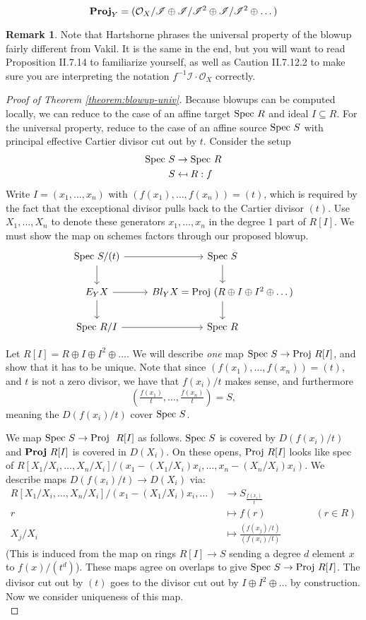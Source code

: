 \documentclass[10pt,reqno]{amsart}
\theoremstyle{definition}
\newtheorem{remark}[theorem]{Remark}
\theoremstyle{remark}
\numberwithin{equation}{section}
\numberwithin{theorem}{section}
\newcommand{\OO}{{\mathcal O}}
\newcommand{\spec}{\textup{Spec }}
\newcommand{\proj}{\textup{Proj }}
\newcommand{\bproj}{\textbf{\textup{Proj}}}
\newcommand{\II}{{\mathscr I}}
\begin{document}
\[\bproj_Y = (\OO_X/\II \oplus \II/\II^2 \oplus \II/\II^2 \oplus \dots) \]

\begin{remark} Note that Hartshorne phrases the universal property of the blowup fairly different from Vakil. It is the same in the end, but you will want to read Proposition II.7.14 to familiarize yourself, as well as Caution II.7.12.2 to make sure you are interpreting the notation $f^{-1}\II \cdot \OO_X$ correctly.
\end{remark}

\begin{proof}[Proof of Theorem \ref{theorem:blowup-univ}]
Because blowups can be computed locally, we can reduce to the case of an affine target $\spec R$ and ideal $I \subseteq R$. For the universal property, reduce to the case of an affine source $\spec S$ with principal effective Cartier divisor cut out by $t$. Consider the setup
\begin{align*}
\spec S &\to \spec R\\
S &\mapsfrom R: f
\end{align*}
Write $I = (x_1,\dots,x_n)$ with $(f(x_1),\dots,f(x_n)) = (t)$, which is required by the fact that the exceptional divisor pulls back to the Cartier divisor $(t)$. Use $X_1,\dots,X_n$ to denote these generators $x_1,\dots,x_n$ in the degree 1 part of $R[I]$. We must show the map on schemes factors through our proposed blowup.
\[
\begin{tikzcd}
\spec S/(t) \arrow[d] \arrow[r]& \spec S \arrow[d]\\
E_Y X \arrow[d] \arrow[r] & Bl_Y X = \proj (R \oplus I \oplus I^2 \oplus \dots) \arrow[d]\\
\spec R/I \arrow[r] & \spec R
\end{tikzcd}
\]

Let $R[I] = R \oplus I \oplus I^2 \oplus \dots$. We will describe \textit{one} map $\spec S \to \proj R[I]$, and show that it has to be unique. Note that since $(f(x_1),\dots,f(x_n)) = (t)$, and $t$ is not a zero divisor, we have that $f(x_i)/t$ makes sense, and furthermore
\[\left(\tfrac{f(x_1)}{t}, \dots, \tfrac{f(x_n)}{t}\right) = S,\]
meaning the $D(f(x_i)/t)$ cover $\spec S$.

We map $\spec S \to \proj \ R[I]$ as follows. $\spec S$ is covered by $D(f(x_i)/t)$ and $\bproj \ R[I]$ is covered in $D(X_i)$. On these opens, $\proj R[I]$ looks like spec of $R[X_1/X_i,\dots,X_n/X_i]/(x_1 - (X_1/X_i)x_i,\dots, x_n - (X_n/X_i)x_i)$. We describe maps $D(f(x_i)/t) \to D(X_i)$ via:
\begin{align*}
R[X_1/X_i,\dots,X_n/X_i]/(x_1 - (X_1/X_i)x_i,\dots) &\longrightarrow S_{\tfrac{f(x_i)}{t}}\\
r &\mapsto f(r) \quad \quad \quad \quad \quad   (r \in R)\\
X_j/X_i &\mapsto \frac{(f(x_j)/t)}{(f(x_i)/t)}
\end{align*}
(This is induced from the map on rings $R[I] \to S$ sending a degree $d$ element $x$ to $f(x)/(t^d)$). These maps agree on overlaps to give $\spec S \to \proj R[I]$. The divisor cut out by $(t)$ goes to the divisor cut out by $I \oplus I^2 \oplus \dots$ by construction. Now we consider uniqueness of this map. 
\\


\end{proof}
\end{document}

